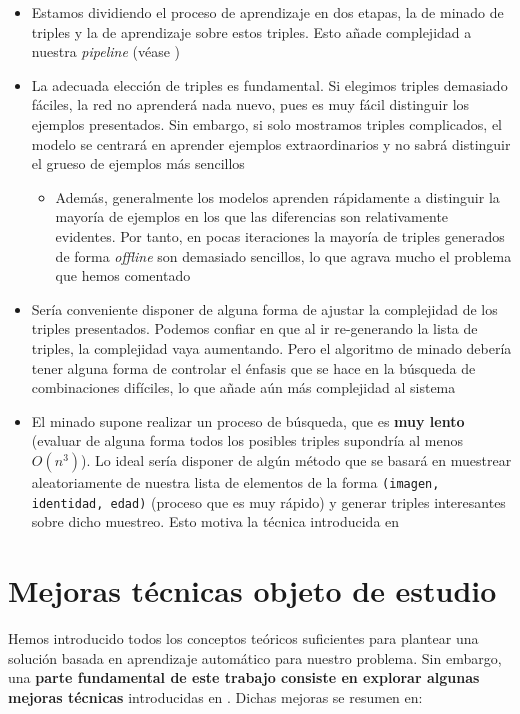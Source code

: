 \begin{itemize}
    \item Estamos dividiendo el proceso de aprendizaje en dos etapas, la de minado de triples y la de aprendizaje sobre estos triples. Esto añade complejidad a nuestra \textit{pipeline} (véase )
    \item La adecuada elección de triples es fundamental. Si elegimos triples demasiado fáciles, la red no aprenderá nada nuevo, pues es muy fácil distinguir los ejemplos presentados. Sin embargo, si solo mostramos triples complicados, el modelo se centrará en aprender ejemplos extraordinarios y no sabrá distinguir el grueso de ejemplos más sencillos
        \begin{itemize}
            \item Además, generalmente los modelos aprenden rápidamente a distinguir la mayoría de ejemplos en los que las diferencias son relativamente evidentes. Por tanto, en pocas iteraciones la mayoría de triples generados de forma \textit{offline} son demasiado sencillos, lo que agrava mucho el problema que hemos comentado
        \end{itemize}
    \item Sería conveniente disponer de alguna forma de ajustar la complejidad de los triples presentados. Podemos confiar en que al ir re-generando la lista de triples, la complejidad vaya aumentando. Pero el algoritmo de minado debería tener alguna forma de controlar el énfasis que se hace en la búsqueda de combinaciones difíciles, lo que añade aún más complejidad al sistema
    \item El minado supone realizar un proceso de búsqueda, que es \textbf{muy lento} (evaluar de alguna forma todos los posibles triples supondría al menos $O(n^3)$). Lo ideal sería disponer de algún método que se basará en muestrear aleatoriamente de nuestra lista de elementos de la forma \lstinline{(imagen, identidad, edad)} (proceso que es muy rápido) y generar triples interesantes sobre dicho muestreo. Esto motiva la técnica introducida en 
\end{itemize}

\section{Mejoras técnicas objeto de estudio} \label{isec:mejoras_tecnicas_objeto_de_estudio}

Hemos introducido todos los conceptos teóricos suficientes para plantear una solución basada en aprendizaje automático para nuestro problema. Sin embargo, una \textbf{parte fundamental de este trabajo consiste en explorar algunas mejoras técnicas} introducidas en \cite{informatica:principal}. Dichas mejoras se resumen en:

